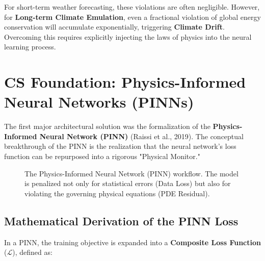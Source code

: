 For short-term weather forecasting, these violations are often negligible. However, for \textbf{Long-term Climate Emulation}, even a fractional violation of global energy conservation will accumulate exponentially, triggering \textbf{Climate Drift}. Overcoming this requires explicitly injecting the laws of physics into the neural learning process.

\section{CS Foundation: Physics-Informed Neural Networks (PINNs)}

The first major architectural solution was the formalization of the \textbf{Physics-Informed Neural Network (PINN)} (Raissi et al., 2019). The conceptual breakthrough of the PINN is the realization that the neural network's loss function can be repurposed into a rigorous "Physical Monitor." 

\begin{figure}[H]
\centering
{}
\caption{The Physics-Informed Neural Network (PINN) workflow. The model is penalized not only for statistical errors (Data Loss) but also for violating the governing physical equations (PDE Residual).}
\label{fig:pinn_tikz}
\end{figure}

\subsection{Mathematical Derivation of the PINN Loss}
In a PINN, the training objective is expanded into a \textbf{Composite Loss Function} ($\mathcal{L}$), defined as:

